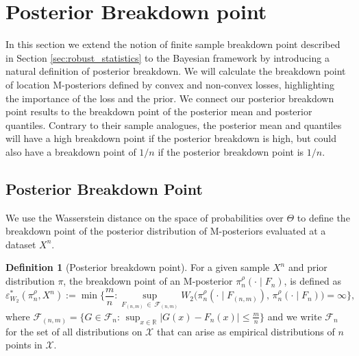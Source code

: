 \documentclass[11pt, oneside]{amsart}
\theoremstyle{definition}   %
\newtheorem{definition}{Definition}
\newcommand{\R}{\mathbb{R}}
\newcommand{\loss}{\rho}
\newcommand{\mposterior}{\pi_n^{\loss}}
\begin{document}
\bigskip

\section{Posterior Breakdown point}
\label{section::posterior-BP}
%
In this section we extend the notion of finite sample breakdown point described in Section \ref{sec:robust_statistics} to the  Bayesian framework by introducing a natural definition of posterior breakdown. We will calculate the breakdown point of location M-posteriors defined by convex and non-convex losses, highlighting the importance of the loss and the prior. We connect our posterior breakdown point results to the breakdown point of the posterior mean and posterior quantiles. Contrary to their sample analogues, the posterior mean and quantiles will have a high breakdown point if the posterior breakdown is high, but could also have a breakdown point of $1/n$ if the posterior breakdown point is $1/n$. 
%
\subsection{Posterior Breakdown Point}
%
We use the Wasserstein distance on the space of probabilities over \( \Theta \) to define the breakdown point of the posterior distribution of M-posteriors evaluated at a dataset $X^n$.
%
\begin{definition}[Posterior breakdown point]
    For a given sample $X^n$ and prior distribution \( \pi \), the breakdown point of an M-posterior \( \mposterior(\cdot \mid F_n) \), is defined as
    \[
        \varepsilon^*_{W_2}(\mposterior, X^n) := 
        \min \biggl\{\frac{m}{n} : \sup_{F_{(n,m)} \,\in \, \mathcal{F}_{(n,m)}}
        W_2 \bigl(\mposterior(\cdot\mid F_{(n,m)}), \, \mposterior(\cdot\mid F_n)\bigr) = \infty \biggr\},
    \]
    where
    \( 
        \mathcal{F}_{(n,m)}=
        \{G \in \mathcal{F}_n:\,\sup_{x \in \R }|G (x)- F_n(x)| \leq \frac{m}{n} \}
    \)
    and we write $\mathcal{F}_n$ for the set of all distributions on $\mathcal{X}$ that can arise as empirical distributions of $n$ points in $\mathcal{X}$.  
\end{definition}
\end{document}
